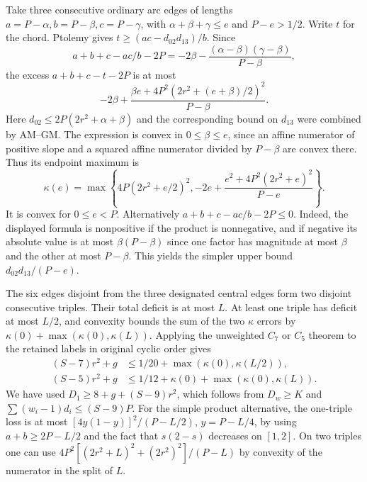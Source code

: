 \documentclass[11pt,a4paper]{article}
\theoremstyle{definition}
\begin{document}
Take three consecutive ordinary arc edges of lengths
$a=P-\alpha,b=P-\beta,c=P-\gamma$, with
$\alpha+\beta+\gamma\le e$ and $P-e>1/2$.  Write $t$ for the chord.
Ptolemy gives $t\ge(ac-d_{02}d_{13})/b$.  Since
\[
 a+b+c-ac/b-2P=-2\beta-
 \frac{(\alpha-\beta)(\gamma-\beta)}{P-\beta},
\]
the excess $a+b+c-t-2P$ is at most
\[
 -2\beta+
 \frac{\beta e+4P^2(2r^2+(e+\beta)/2)^2}{P-\beta}.
\]
Here $d_{02}\le2P(2r^2+\alpha+\beta)$ and the corresponding
bound on $d_{13}$ were combined by AM--GM.  The expression is convex
in $0\le\beta\le e$, since an affine numerator of positive slope and a
squared affine numerator divided by $P-\beta$ are convex there.
Thus its endpoint maximum is
\[
 \kappa(e)=\max\left\{4P(2r^2+e/2)^2,
   -2e+\frac{e^2+4P^2(2r^2+e)^2}{P-e}\right\}.
\]
It is convex for $0\le e<P$.  Alternatively
$a+b+c-ac/b-2P\le0$. Indeed, the displayed formula is nonpositive if the
product is nonnegative, and if negative its absolute value is at most
$\beta(P-\beta)$ since one factor has magnitude at most $\beta$ and
the other at most $P-\beta$.  This yields the simpler upper bound
$d_{02}d_{13}/(P-e)$.

The six edges disjoint from the three designated central edges form two
disjoint consecutive triples.  Their total deficit is at most $L$.
At least one triple has deficit at most $L/2$, and convexity bounds the
sum of the two $\kappa$ errors by $\kappa(0)+\max(\kappa(0),\kappa(L))$.
Applying the unweighted $C_7$ or $C_5$ theorem to the retained labels in
original cyclic order gives
\begin{align*}
 (S-7)r^2+g &\le 1/20+\max(\kappa(0),\kappa(L/2)),\\
 (S-5)r^2+g &\le 1/12+\kappa(0)+\max(\kappa(0),\kappa(L)).
\end{align*}
We have used $D_1\ge 8+g+(S-9)r^2$, which follows from $D_w\ge K$
and $\sum(w_i-1)d_i\le(S-9)P$.  For the simple product alternative,
the one-triple loss is at most $[4y(1-y)]^2/(P-L/2)$,
$y=P-L/4$, by using $a+b\ge2P-L/2$ and the fact that $s(2-s)$ decreases
on $[1,2]$.  On two triples one can use
$4P^2[(2r^2+L)^2+(2r^2)^2]/(P-L)$ by convexity of the numerator in
the split of $L$.
\end{document}

